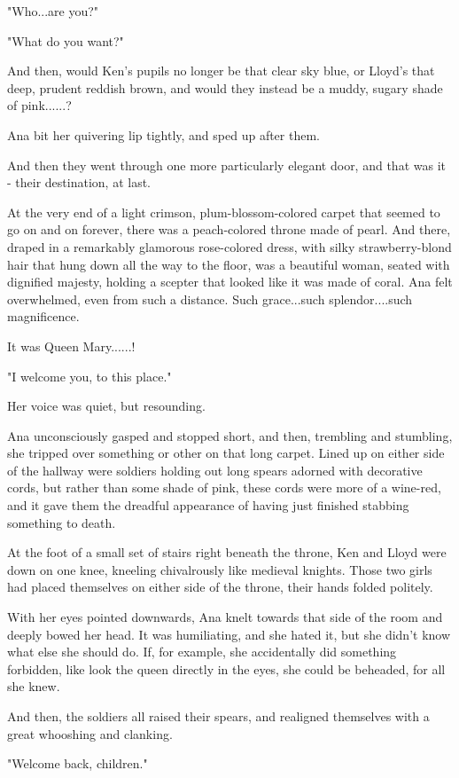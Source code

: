 \documentclass[
]{article}
\begin{document}
"Who...are you?"

"What do you want?"

And then, would Ken's pupils no longer be that clear sky blue, or
Lloyd's that deep, prudent reddish brown, and would they instead be a
muddy, sugary shade of pink......?

Ana bit her quivering lip tightly, and sped up after them.

And then they went through one more particularly elegant door, and that
was it - their destination, at last.

At the very end of a light crimson, plum-blossom-colored carpet that
seemed to go on and on forever, there was a peach-colored throne made of
pearl. And there, draped in a remarkably glamorous rose-colored dress,
with silky strawberry-blond hair that hung down all the way to the
floor, was a beautiful woman, seated with dignified majesty, holding a
scepter that looked like it was made of coral. Ana felt overwhelmed,
even from such a distance. Such grace...such splendor....such
magnificence.

It was Queen Mary......!

"I welcome you, to this place."

Her voice was quiet, but resounding.

Ana unconsciously gasped and stopped short, and then, trembling and
stumbling, she tripped over something or other on that long carpet.
Lined up on either side of the hallway were soldiers holding out long
spears adorned with decorative cords, but rather than some shade of
pink, these cords were more of a wine-red, and it gave them the dreadful
appearance of having just finished stabbing something to death.

At the foot of a small set of stairs right beneath the throne, Ken and
Lloyd were down on one knee, kneeling chivalrously like medieval
knights. Those two girls had placed themselves on either side of the
throne, their hands folded politely.

With her eyes pointed downwards, Ana knelt towards that side of the room
and deeply bowed her head. It was humiliating, and she hated it, but she
didn't know what else she should do. If, for example, she accidentally
did something forbidden, like look the queen directly in the eyes, she
could be beheaded, for all she knew.

And then, the soldiers all raised their spears, and realigned themselves
with a great whooshing and clanking.

"Welcome back, children."
\end{document}
